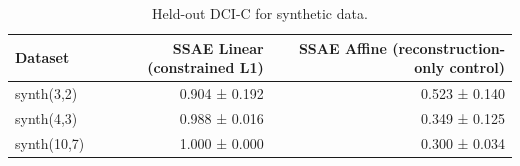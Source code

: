 \begin{table}[t]
\centering
\caption{Held-out DCI-C for synthetic data.}
\label{tab:synthetic-dci-c}
\begin{tabular}{lrr}
\toprule
Dataset & SSAE Linear (constrained L1) & SSAE Affine (reconstruction-only control) \\
\midrule
synth(3,2) & 0.904 ± 0.192 & 0.523 ± 0.140 \\
synth(4,3) & 0.988 ± 0.016 & 0.349 ± 0.125 \\
synth(10,7) & 1.000 ± 0.000 & 0.300 ± 0.034 \\
\bottomrule
\end{tabular}
\end{table}
